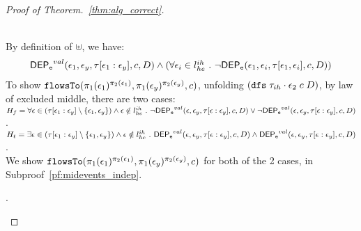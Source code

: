 \begin{proof}[Proof of Theorem.~\ref{thm:alg_correct}]
\begin{case}
\begin{subcase}
\begin{subsubcase}
%
\\
By definition of $\uplus$, we have:
\[
\begin{array}{l}
  \mathsf{DEP_{\mathtt{e}}}^{val}(\mathtt{\epsilon}_1, \mathtt{\epsilon}_y, \mathtt{\tau}[\mathtt{\epsilon}_1:\mathtt{\epsilon}_y], c, D)
  \land (\forall \mathtt{\epsilon}_i \in l^{ih}_{he} ~.~ \neg \mathsf{DEP_{\mathtt{e}}}(\mathtt{\epsilon}_1, \mathtt{\epsilon}_i, \mathtt{\tau}[\mathtt{\epsilon}_1, \mathtt{\epsilon}_i], c, D))
  \end{array}
\]
%
%
To show $\mathtt{flowsTo}(\pi_1(\mathtt{\epsilon}_1)^{\pi_2(\mathtt{\epsilon}_1)}, \pi_1(\mathtt{\epsilon}_y)^{\pi_2(\mathtt{\epsilon}_y)}, c)$, 
%
unfolding $ (\mathtt{dfs} \; {\mathtt{\tau}_{ih} \cdot \mathtt{\epsilon}_2} \; c \; D)$, by law of excluded middle,   there are two cases:
\\
$H_f =  \forall \mathtt{\epsilon} \in (\mathtt{\tau}[\mathtt{\epsilon}_1:\mathtt{\epsilon}_y]\setminus \{\mathtt{\epsilon}_1, \mathtt{\epsilon}_y\}) 
 \land \mathtt{\epsilon} \notin l^{ih}_{he} ~.~
\neg \mathsf{DEP_{\mathtt{e}}}^{val} (\mathtt{\epsilon}, \mathtt{\epsilon}_y, \mathtt{\tau}[\mathtt{\epsilon}:\mathtt{\epsilon}_y], c, D) \lor \neg \mathsf{DEP_{\mathtt{e}}}^{val} (\mathtt{\epsilon}, \mathtt{\epsilon}_y, \mathtt{\tau}[\mathtt{\epsilon}:\mathtt{\epsilon}_y], c, D)$.
\\
$H_t = \exists \mathtt{\epsilon} \in (\mathtt{\tau}[\mathtt{\epsilon}_1:\mathtt{\epsilon}_y]\setminus \{\mathtt{\epsilon}_1, \mathtt{\epsilon}_y\}) 
\land \mathtt{\epsilon} \notin l^{ih}_{he} ~.~
\mathsf{DEP_{\mathtt{e}}}^{val} (\mathtt{\epsilon}, \mathtt{\epsilon}_y, \mathtt{\tau}[\mathtt{\epsilon}:\mathtt{\epsilon}_y], c, D) \land \mathsf{DEP_{\mathtt{e}}}^{val} (\mathtt{\epsilon}, \mathtt{\epsilon}_y, \mathtt{\tau}[\mathtt{\epsilon}:\mathtt{\epsilon}_y], c, D)$.
\\
We show $\mathtt{flowsTo}(\pi_1(\mathtt{\epsilon}_1)^{\pi_2(\mathtt{\epsilon}_1)}, \pi_1(\mathtt{\epsilon}_y)^{\pi_2(\mathtt{\epsilon}_y)}, c)$ for both of the 2 cases,
 in Subproof~\ref{pf:midevents_indep}.
%
\begin{subproof}.
  \label{pf:midevents_indep}
  \\

\end{subproof}
\end{subsubcase}
\end{subcase}
\end{case}
\end{proof}
